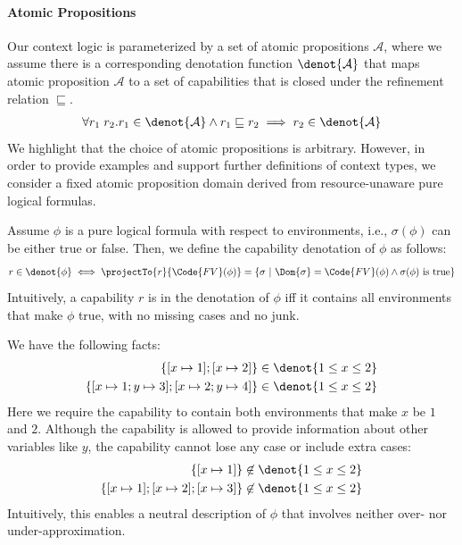 \paragraph{Atomic Propositions} Our context logic is parameterized by a set of atomic propositions $\mathcal{A}$, where we assume there is a corresponding denotation function $\denot{\mathcal{A}}$ that maps atomic proposition $\mathcal{A}$ to a set of capabilities that is closed under the refinement relation $\sqsubseteq$.
\begin{align*}
  \forall r_1\; r_2. r_1 \in \denot{\mathcal{A}} \land r_1 \sqsubseteq r_2 \implies r_2 \in \denot{\mathcal{A}}
\end{align*}
We highlight that the choice of atomic propositions is arbitrary. However, in order to provide examples and support further definitions of context types, we consider a fixed atomic proposition domain derived from resource-unaware pure logical formulas.

\begin{definition} Assume $\phi$ is a pure logical formula with respect to environments, i.e., $\sigma(\phi)$ can be either true or false. Then, we define the capability denotation of $\phi$ as follows:
\begin{align*}
  r \in \denot{\phi} \iff \projectTo{r}{\Code{FV}(\phi)} = \{ \sigma ~|~ \Dom{\sigma} = \Code{FV}(\phi) \land \sigma(\phi) \text{ is true} \} 
\end{align*}
Intuitively, a capability $r$ is in the denotation of $\phi$ iff it contains all environments that make $\phi$ true, with no missing cases and no junk.
\end{definition}

\begin{example}
  We have the following facts:
  \begin{align*}
    \{ [x\mapsto 1]; [x\mapsto 2] \} &\in \denot{1 \leq x \leq 2}
    \\\{ [x\mapsto 1; y \mapsto 3]; [x\mapsto 2; y \mapsto 4] \} &\in \denot{1 \leq x \leq 2}
  \end{align*}\noindent
  Here we require the capability to contain both environments that make $x$ be $1$ and $2$. Although the capability is allowed to provide information about other variables like $y$, the capability cannot lose any case or include extra cases:
  \begin{align*}
    \{ [x\mapsto 1] \} &\not\in \denot{1 \leq x \leq 2}
    \\\{ [x\mapsto 1]; [x\mapsto 2]; [x\mapsto 3] \} &\not\in \denot{1 \leq x \leq 2}
  \end{align*}\noindent
  Intuitively, this enables a neutral description of $\phi$ that involves neither over- nor under-approximation.
\end{example}


